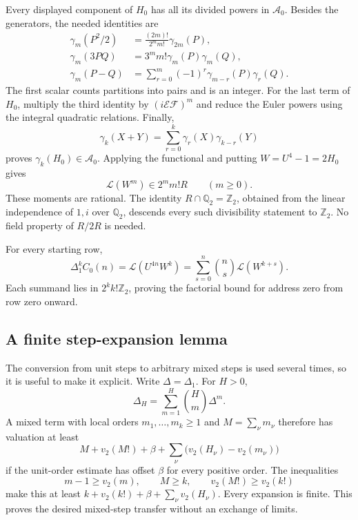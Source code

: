 Every displayed component of $H_0$ has all its divided powers in
$\mathcal A_0$. Besides the generators, the needed identities are
\begin{align}
 \gamma_m(P^2/2)
     &=\frac{(2m)!}{2^m m!}\gamma_{2m}(P),\nonumber\\
 \gamma_m(3PQ)&=3^m m!\gamma_m(P)\gamma_m(Q),\nonumber\\
 \gamma_m(P-Q)&=\sum_{r=0}^m(-1)^r
                   \gamma_{m-r}(P)\gamma_r(Q).
 \label{eq:components-divided-powers}
\end{align}
The first scalar counts partitions into pairs and is an integer.
For the last term of $H_0$, multiply the third identity by
$(i\mathcal E\mathcal F)^m$ and reduce the Euler powers using the
integral quadratic relations. Finally,
\[
 \gamma_k(X+Y)=\sum_{r=0}^k\gamma_r(X)\gamma_{k-r}(Y)
\]
proves $\gamma_k(H_0)\in\mathcal A_0$. Applying the functional and
putting $W=U^4-1=2H_0$ gives
\begin{equation}
 \mathcal L(W^m)\in2^m m!R\qquad(m\geq0).
 \label{eq:euler-W-factorial}
\end{equation}
These moments are rational. The identity
$R\cap\mathbb Q_2=\mathbb Z_2$, obtained from the linear independence
of $1,i$ over $\mathbb Q_2$, descends every such divisibility statement
to $\mathbb Z_2$. No field property of $R/2R$ is needed.

For every starting row,
\begin{equation}
 \Delta_1^k C_0(n)
   =\mathcal L(U^{4n}W^k)
   =\sum_{s=0}^n\binom ns\mathcal L(W^{k+s}).
 \label{eq:base-row-finite-expansion}
\end{equation}
Each summand lies in $2^k k!\mathbb Z_2$, proving the factorial
bound for address zero from row zero onward.

\subsection{A finite step-expansion lemma}

The conversion from unit steps to arbitrary mixed steps is used several
times, so it is useful to make it explicit. Write $\Delta=\Delta_1$.
For $H>0$,
\begin{equation}
 \Delta_H=\sum_{m=1}^H\binom Hm\Delta^m.
 \label{eq:finite-step-expansion}
\end{equation}
A mixed term with local orders $m_1,\ldots,m_k\geq1$ and
$M=\sum_\nu m_\nu$ therefore has valuation at least
\[
 M+v_2(M!)+\beta
    +\sum_\nu\bigl(v_2(H_\nu)-v_2(m_\nu)\bigr)
\]
if the unit-order estimate has offset $\beta$ for every positive order.
The inequalities
\[
 m-1\geq v_2(m),\qquad M\geq k,\qquad v_2(M!)\geq v_2(k!)
\]
make this at least $k+v_2(k!)+\beta+\sum_\nu v_2(H_\nu)$.
Every expansion is finite. This proves the desired mixed-step transfer
without an exchange of limits.


